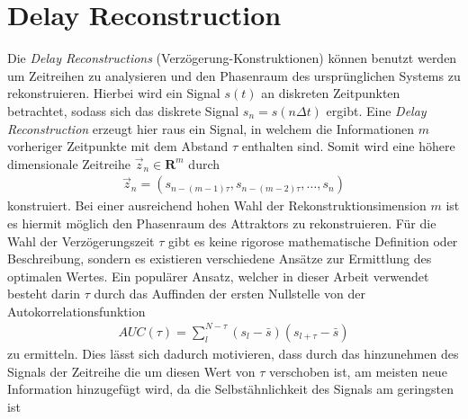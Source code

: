 \section{Delay Reconstruction}
Die \textit{Delay Reconstructions} (Verzögerung-Konstruktionen) können benutzt werden um Zeitreihen zu analysieren und den Phasenraum des ursprünglichen Systems zu rekonstruieren.
Hierbei wird ein Signal $s(t)$ an diskreten Zeitpunkten betrachtet, sodass sich das diskrete Signal $s_n = s(n\Delta t)$ ergibt. Eine \textit{Delay Reconstruction} erzeugt hier raus ein Signal, in welchem die Informationen $m$ vorheriger Zeitpunkte mit dem Abstand $\tau$ enthalten sind. Somit wird eine höhere dimensionale Zeitreihe $\vec{z}_n \in \mathbf{R}^{m}$ durch
\begin{align}
	\vec{z}_n = \left(s_{n-(m-1)\tau}, s_{n-(m-2)\tau}, \ldots ,s_n \right)
\end{align} 
konstruiert. Bei einer ausreichend hohen Wahl der Rekonstruktionsimension $m$ ist es hiermit möglich den Phasenraum des Attraktors zu rekonstruieren. Für die Wahl der Verzögerungszeit $\tau$ gibt es keine rigorose mathematische Definition oder Beschreibung, sondern es existieren verschiedene Ansätze zur Ermittlung des optimalen Wertes. Ein populärer Ansatz, welcher in dieser Arbeit verwendet besteht darin $\tau$ durch das Auffinden der ersten Nullstelle von der Autokorrelationsfunktion 
\begin{align}
AUC(\tau) = \sum_l^{N-\tau} (s_l-\bar{s})(s_{l+\tau}-\bar{s})
\end{align}   
zu ermitteln. Dies lässt sich dadurch motivieren, dass durch das hinzunehmen des Signals der Zeitreihe die um diesen Wert von $\tau$ verschoben ist, am meisten neue Information hinzugefügt wird, da die Selbstähnlichkeit des Signals am geringsten ist \citep[30\,ff.]{kantz2004nonlinear}